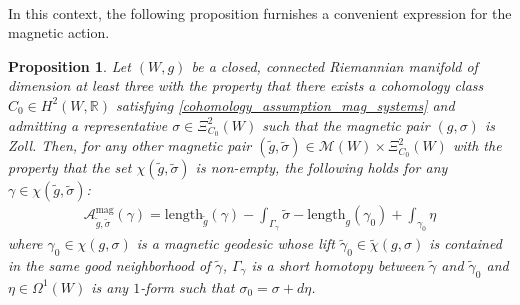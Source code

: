\documentclass[11pt]{amsart}
\theoremstyle{plain}
\newtheorem{proposition}[theorem]{Proposition}
\theoremstyle{definition}
\theoremstyle{remark}
\begin{document}
\\
In this context, the following proposition furnishes a convenient expression for the magnetic action.
\begin{proposition}\label{mag_sys_action_general_propsition}
    Let $(W,g)$ be a closed, connected Riemannian manifold of dimension at least three with the property that there exists a cohomology class $C_0 \in H^2(W,\mathbb{R})$ satisfying \eqref{cohomology_assumption_mag_systems} and admitting a representative $\sigma \in \Xi^2_{C_0}(W)$ such that the magnetic pair $(g,\sigma)$ is Zoll. Then, for any other magnetic pair $(\tilde g,\tilde\sigma) \in \mathcal{M}(W)\times \Xi_{C_0}^2(W)$ with the property that the set $\chi(\tilde g,\tilde\sigma)$ is non-empty, the following holds for any $\gamma \in \chi(\tilde g,\tilde\sigma)$:
    \begin{align}
\mathcal{A}^{\text{mag}}_{\tilde g,\tilde \sigma}(\gamma)=  \text{length}_{\tilde g}(\gamma) - \int_{\Gamma_{\gamma}} \tilde \sigma - \text{length}_{g}(\gamma_0) + \int_{\gamma_0}\eta
    \end{align}
    where $\gamma_0 \in \chi(g,\sigma)$ is a magnetic geodesic whose lift $\tilde \gamma_0 \in \tilde \chi(g,\sigma)$ is contained in the same good neighborhood of $\tilde \gamma$, $\Gamma_\gamma$ is a short homotopy between $\tilde \gamma$ and $\tilde \gamma_0$ and $\eta \in \Omega^1(W)$ is any $1$-form such that $\sigma_0 = \sigma+d\eta$.
\end{proposition}
\end{document}
